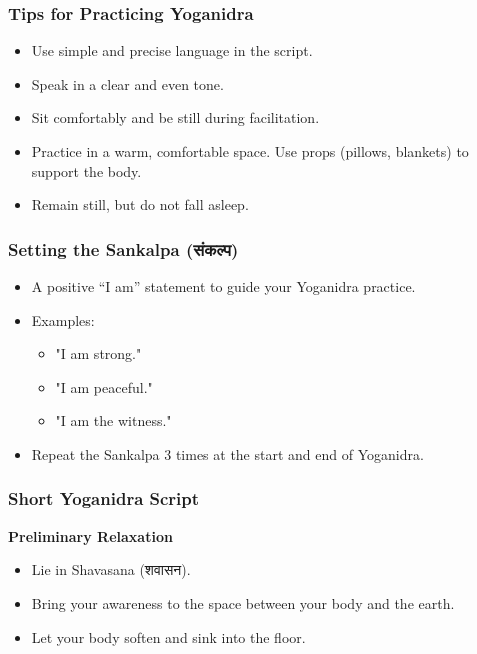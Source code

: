 \begin{frame}[fragile]\frametitle{Tips for Practicing Yoganidra}
    \begin{itemize}
        \item Use simple and precise language in the script.
        \item Speak in a clear and even tone.
        \item Sit comfortably and be still during facilitation.
        \item Practice in a warm, comfortable space. Use props (pillows, blankets) to support the body.
        \item Remain still, but do not fall asleep.
    \end{itemize}
\end{frame}

\begin{frame}[fragile]\frametitle{Setting the Sankalpa (संकल्प)}
    \begin{itemize}
        \item A positive “I am” statement to guide your Yoganidra practice.
        \item Examples:
        \begin{itemize}
            \item "I am strong."
            \item "I am peaceful."
            \item "I am the witness."
        \end{itemize}
        \item Repeat the Sankalpa 3 times at the start and end of Yoganidra.
    \end{itemize}
\end{frame}

\begin{frame}[fragile]\frametitle{Short Yoganidra Script}
    \textbf{Preliminary Relaxation}
    \begin{itemize}
        \item Lie in Shavasana (शवासन).
        \item Bring your awareness to the space between your body and the earth.
        \item Let your body soften and sink into the floor.
    \end{itemize}
\end{frame}


